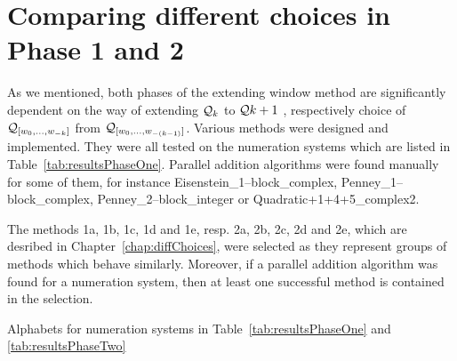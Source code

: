 

\section{Comparing different choices in Phase 1 and 2}
\label{sec:compareMethods}

As we mentioned, both phases of the extending window method are significantly dependent on the way of extending $\mathcal{Q}_k$ to $\mathcal{Q}{k+1}$ , respectively choice of $\mathcal{Q}_{[w_{0}, \dots, w_{-k}]}$ from $\mathcal{Q}_{[w_{0}, \dots, w_{-(k-1)}]}$. Various methods were designed and implemented. They were all tested on the numeration systems which are listed in Table~\ref{tab:resultsPhaseOne}. Parallel addition algorithms were found manually~\cite{milena} for some of them, for instance Eisenstein\_1--block\_complex, Penney\_1--block\_complex, Penney\_2--block\_integer or Quadratic+1+4+5\_complex2. 

The methods 1a, 1b, 1c, 1d and 1e, resp. 2a, 2b, 2c, 2d and 2e, which are desribed in Chapter~\ref{chap:diffChoices}, were selected as they represent groups of methods which behave similarly. Moreover, if a parallel addition algorithm was found for a numeration system, then at least one successful method is contained in the selection.



\begin{table}[htb]
	\begin{center}
	
	\end{center}
\caption{Alphabets for numeration systems in Table~\ref{tab:resultsPhaseOne} and \ref{tab:resultsPhaseTwo}}
\label{tab:alphabets}
\end{table}





